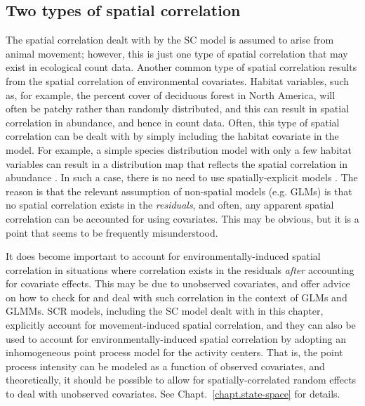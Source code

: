 \subsection{Two types of spatial correlation}

The spatial correlation dealt with by the SC model is assumed to arise
from animal movement; however, this is just one type of spatial
correlation that may exist in ecological count data. Another common
type of spatial correlation results from the spatial correlation of
environmental covariates. Habitat variables, such as, for example, the percent cover
of deciduous forest in North America, will often be patchy rather than randomly
distributed, and this can result in spatial correlation in abundance,
and hence in count data.  %
Often, this type of spatial correlation can be dealt with by simply including
the habitat covariate in the model. For example, a simple species
distribution model with only a few habitat variables can result in a
distribution map that reflects the spatial correlation in abundance
\citep{sillett_etal:2012,royle_etal:2012mee2}. In such a case, there is no
need to use spatially-explicit models %
\citep{besag_kooperber:1995,lichstein_etal:2002,wikle:2010}.  The reason is that the
relevant assumption of non-spatial models (e.g. GLMs) is that
no spatial correlation exists in the \textit{residuals}, and often,
any apparent spatial correlation can be accounted for using
covariates. This may be obvious, but
it is a point that seems to be frequently misunderstood.

It does become
important to account for environmentally-induced spatial correlation
in situations where correlation exists in the residuals
\textit{after} accounting for covariate effects. This may be due to
unobserved covariates, and \citet{zuur_etal:2009} offer advice on
how to check for and deal with such correlation in the context of
GLMs and GLMMs. %
SCR models, including the SC model dealt with in this
chapter, explicitly account for movement-induced spatial
correlation, and they can also be used to account for
environmentally-induced spatial correlation by adopting an
inhomogeneous point process model for the activity centers. That is,
the point process intensity can be modeled as a function of observed
covariates, and theoretically, it should be possible to allow for
spatially-correlated random effects to deal with unobserved covariates.
See Chapt.~\ref{chapt.state-space} for details.




